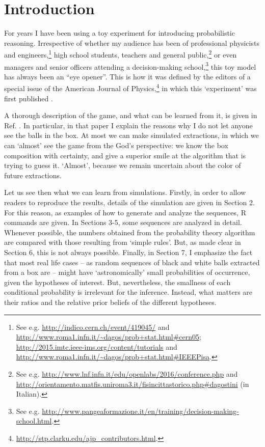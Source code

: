 \documentclass[11pt]{article}
\begin{document}
\section{Introduction}
For years I have been  using a toy experiment
for introducing probabilistic reasoning. 
Irrespective of whether my audience has been of professional 
physicists and engineers,\footnote{See e.g. 
\url{http://indico.cern.ch/event/419045/}
and \url{http://www.roma1.infn.it/~dagos/prob+stat.html#cern05}; 
\url{http://2015.imtc.ieee-ims.org/content/tutorials} 
and \url{http://www.roma1.infn.it/~dagos/prob+stat.html#IEEEPisa}.
} 
high school 
students, teachers and general public,\footnote{See e.g. 
\url{http://www.lnf.infn.it/edu/openlabs/2016/conference.php} 
and
\url{http://orientamento.matfis.uniroma3.it/fisincittastorico.php#dagostini}
(in Italian).
} 
or even managers and senior officers attending a 
decision-making school,\footnote{See e.g. 
\url{http://www.pangeaformazione.it/en/training/decision-making-school.html}.} 
this toy model has always been an ``eye opener''. 
This is how it was defined by the editors of a special issue 
of the American Journal of
 Physics,\footnote{\url{http://stp.clarku.edu/ajp_contributors.html}.} 
in which this `experiment' was first published \cite{AJP}. 

A thorough description of the game, and what can be learned from it, 
is given in Ref. \cite{ME2016}.
In particular, in that paper I explain the reasons 
why I do not let anyone see the balls in the box.  
At most we can make simulated extractions, 
in which we can `almost' see the game from the 
God's perspective: we know the box composition
with certainty, and give a
superior smile at the algorithm that is trying 
to guess it.
`Almost', because we remain uncertain 
about the color of future extractions. 

Let us see then what we can learn from simulations. 
Firstly, in order to allow readers to reproduce the results,
details of the simulation are given in Section 2. 
For this reason, as examples of how to generate and analyze 
the sequences, R commands are given. 
In Sections 3-5, some sequences are analyzed in detail. Whenever possible,
the numbers obtained from the probability theory algorithm are compared
with those resulting from `simple rules'. But, as made clear in
Section 6, this is not always possible. 
Finally,  in Section 7, I emphasize the fact that most real life cases --
as random sequences of black and white balls extracted from a box are -- 
might have `astronomically' small probabilities of occurrence,
given the hypotheses of interest. 
But, nevertheless, the smallness of each  
conditional probability is irrelevant for the 
inference. Instead, what matters are their ratios 
and the relative prior beliefs of the different hypotheses. 
\end{document}
